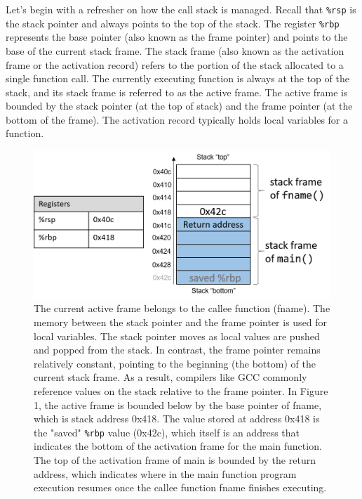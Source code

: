   Let’s begin with a refresher on how the call stack is managed. Recall that \texttt{\%rsp} is the stack pointer and always points to the top of the stack. The register \texttt{\%rbp} represents the base pointer (also known as the frame pointer) and points to the base of the current stack frame. The stack frame (also known as the activation frame or the activation record) refers to the portion of the stack allocated to a single function call. The currently executing function is always at the top of the stack, and its stack frame is referred to as the active frame. The active frame is bounded by the stack pointer (at the top of stack) and the frame pointer (at the bottom of the frame). The activation record typically holds local variables for a function.

  \begin{figure}[H]
    \centering 
    \includegraphics[scale=0.6]{img/stackFrame.png}
    \caption{The current active frame belongs to the callee function (fname). The memory between the stack pointer and the frame pointer is used for local variables. The stack pointer moves as local values are pushed and popped from the stack. In contrast, the frame pointer remains relatively constant, pointing to the beginning (the bottom) of the current stack frame. As a result, compilers like GCC commonly reference values on the stack relative to the frame pointer. In Figure 1, the active frame is bounded below by the base pointer of fname, which is stack address 0x418. The value stored at address 0x418 is the "saved" \texttt{\%rbp} value (0x42c), which itself is an address that indicates the bottom of the activation frame for the main function. The top of the activation frame of main is bounded by the return address, which indicates where in the main function program execution resumes once the callee function fname finishes executing. }
    \label{fig:stack_frame_management}
  \end{figure}


